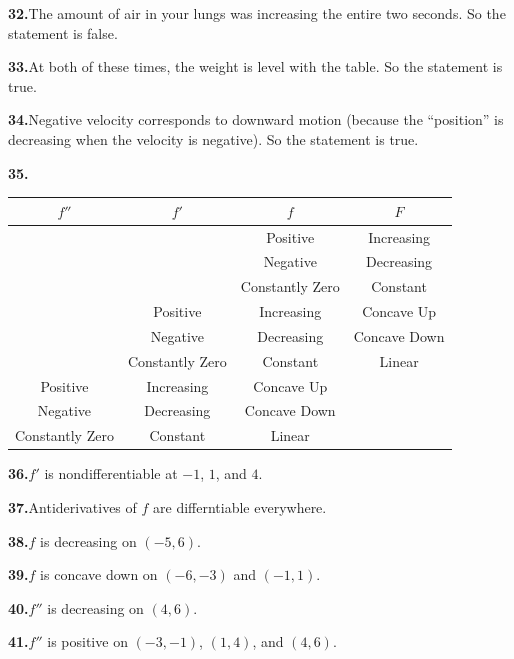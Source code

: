 \documentclass[10pt,oneside,]{book}
\theoremstyle{plain}
\theoremstyle{definition}
\numberwithin{equation}{section}
\newcommand{\ointerval}[2]{\left(#1,#2\right)}
\newcommand{\fd}[1]{#1'}
\newcommand{\sd}[1]{#1''}
\begin{document}
\par\smallskip
\noindent\textbf{32.}\quad{}The amount of air in your lungs was increasing the entire two seconds. So the statement is false.%
\par\smallskip
\noindent\textbf{33.}\quad{}At both of these times, the weight is level with the table. So the statement is true.%
\par\smallskip
\noindent\textbf{34.}\quad{}Negative velocity corresponds to downward motion (because the ``position'' is decreasing when the velocity is negative). So the statement is true.%
\par\smallskip
\noindent\textbf{35.}\quad{}\begin{table}
\centering
\begin{tabular}{c|c|c|c}
\toprule
\(\sd{f}\)&\(\fd{f}\)&\(f\)&\(F\)\\
\midrule
&&Positive&Increasing\\
\midrule
&&Negative&Decreasing\\
\midrule
&&Constantly Zero&Constant\\
\midrule
&Positive&Increasing&Concave Up\\
\midrule
&Negative&Decreasing&Concave Down\\
\midrule
&Constantly Zero&Constant&Linear\\
\midrule
Positive&Increasing&Concave Up&\\
\midrule
Negative&Decreasing&Concave Down&\\
\midrule
Constantly Zero&Constant&Linear&\\
\bottomrule
\end{tabular}
\end{table}
\par\smallskip
\noindent\textbf{36.}\quad{}\(\fd{f}\) is nondifferentiable at \(-1\), \(1\), and \(4\).%
\par\smallskip
\noindent\textbf{37.}\quad{}Antiderivatives of \(f\) are differntiable everywhere.%
\par\smallskip
\noindent\textbf{38.}\quad{}\(f\) is decreasing on \(\ointerval{-5}{6}\).%
\par\smallskip
\noindent\textbf{39.}\quad{}\(f\) is concave down on \(\ointerval{-6}{-3}\) and \(\ointerval{-1}{1}\).%
\par\smallskip
\noindent\textbf{40.}\quad{}\(\sd{f}\) is decreasing on \(\ointerval{4}{6}\).%
\par\smallskip
\noindent\textbf{41.}\quad{}\(\sd{f}\) is positive on \(\ointerval{-3}{-1}\), \(\ointerval{1}{4}\), and \(\ointerval{4}{6}\).%
\end{document}
